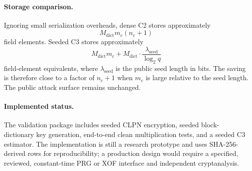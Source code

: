 \paragraph{Storage comparison.}
Ignoring small serialization overheads, dense C2 stores approximately
\[
  M_{\mathrm{dict}}m_c(n_c+1)
\]
field elements.  Seeded C3 stores approximately
\[
  M_{\mathrm{dict}}m_c + M_{\mathrm{dict}}\cdot\frac{\lambda_{\mathrm{seed}}}{\log_2 q}
\]
field-element equivalents, where $\lambda_{\mathrm{seed}}$ is the public seed length in
bits.  The saving is therefore close to a factor of $n_c+1$ when $m_c$ is large
relative to the seed length.  The public attack surface remains unchanged.

\paragraph{Implemented status.}
The validation package includes seeded CLPN encryption, seeded block-dictionary
key generation, end-to-end clean multiplication tests, and a seeded C3 estimator.
The implementation is still a research prototype and uses SHA-256-derived rows
for reproducibility; a production design would require a specified, reviewed,
constant-time PRG or XOF interface and independent cryptanalysis.
